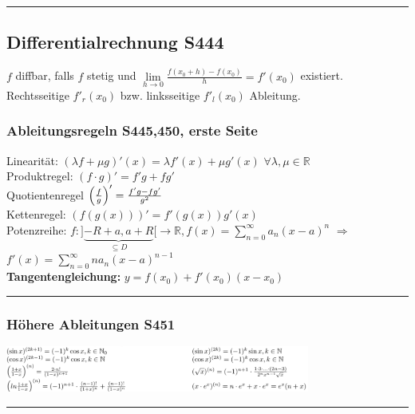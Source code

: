 \hrule
\subsection{Differentialrechnung \color{red}S444}
$f$ diffbar, falls $f$ stetig und $\underset{h\rightarrow 0}{\lim}\frac{f(x_0+h)-f(x_0)}{h}=f'(x_0)$ existiert.\\
Rechtsseitige $f'_{r}(x_{0})$ bzw. linksseitige $f'_{l}(x_{0})$ Ableitung.\\

\subsubsection{Ableitungsregeln \color{red}S445,450, erste Seite}
Linearität: $(\lambda f + \mu g)' (x) = \lambda f'(x) + \mu g'(x)$ \quad $\forall \lambda, \mu \in \mathbb R$ \\
Produktregel: $(f \cdot g)' = f' g + f g'$\\
Quotientenregel $\left(\frac{f}{g}\right)' = \frac{f'g - fg'}{g^2}$\\
Kettenregel: $\left( f(g(x)) \right)' = f'(g(x)) g'(x)$\\
Potenzreihe: $f: ] \underbrace{-R+a, a+R}_{\subseteq D}	 [ \rightarrow \mathbb R, f(x) = \sum_{n=0}^{\infty} a_n (x -a)^n$ \quad $\Rightarrow$ \quad $f'(x) = \sum_{n=0}^{\infty} n a_{n} (x-a)^{n-1}$\\
\textbf{Tangentengleichung:} $y=f(x_0)+f'(x_0)(x-x_0)$
\hrule
\subsubsection{Höhere Ableitungen \color{red}S451}
\includegraphics[width=10cm]{images/HoehAbl.PNG}\\
\hrule
